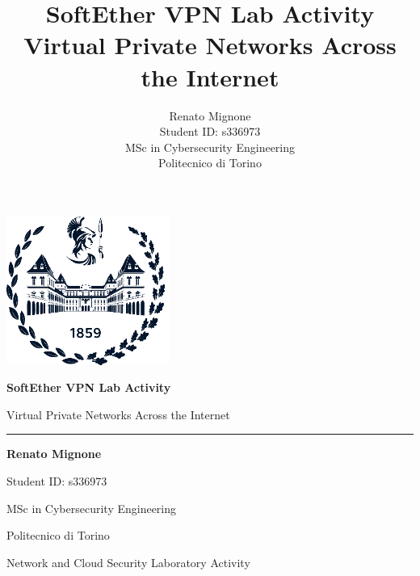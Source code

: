 \documentclass[a4paper,10pt]{article}
\title{SoftEther VPN Lab Activity\\
\large Virtual Private Networks Across the Internet}
\author{Renato Mignone\\
\small Student ID: s336973\\
\small MSc in Cybersecurity Engineering\\
\small Politecnico di Torino}
\begin{document}
\begin{titlepage}
\centering

\vspace*{2cm}

\includegraphics[width=0.4\textwidth]{../resources/General/polito_logo.png}

\vspace{1.5cm}

{\Huge \textbf{SoftEther VPN Lab Activity}}

\vspace{0.5cm}

{\LARGE Virtual Private Networks Across the Internet}

\vspace{1cm}

\rule{\textwidth}{1pt}

\vspace{2cm}

{\Large \textbf{Renato Mignone}}

\vspace{0.5cm}

{\large Student ID: s336973}

\vspace{1cm}

{\large MSc in Cybersecurity Engineering}

\vspace{0.5cm}

{\large Politecnico di Torino}

\vspace{2cm}

\vfill

{\small Network and Cloud Security Laboratory Activity}

\end{titlepage}



\newpage

\tableofcontents
\thispagestyle{empty}
\newpage










% 
% 
\end{document}
